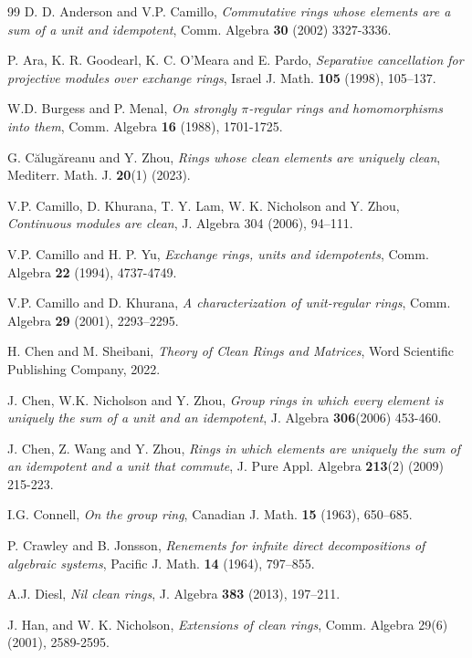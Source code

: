 \documentclass[12pt]{amsart}
\theoremstyle{definition}
\begin{document}

\begin{thebibliography}{99}
 D. D. Anderson and  V.P. Camillo, \textit{Commutative rings whose elements are a sum of a unit and idempotent},  Comm. Algebra  \textbf{ 30} (2002) 3327-3336.

P. Ara, K. R. Goodearl, K. C. O'Meara and  E. Pardo, \textit{Separative cancellation for projective modules over exchange rings},  Israel J. Math.  {\bf 105} (1998), 105--137.

 W.D. Burgess and P. Menal, \textit{On strongly $\pi$-regular rings and homomorphisms into them}, Comm. Algebra {\bf 16} (1988), 1701-1725.

G. C\u{a}lug\u{a}reanu and Y. Zhou, \textit{Rings whose clean elements are uniquely clean},  Mediterr. Math. J.  {\bf 20}(1) (2023).

V.P. Camillo, D. Khurana, T. Y. Lam, W. K. Nicholson and Y. Zhou, \textit{Continuous modules are clean},  J. Algebra 304 (2006), 94--111.

V.P. Camillo and  H. P. Yu, \textit{Exchange rings, units and idempotents}, Comm. Algebra {\bf 22} (1994), 4737-4749.

V.P. Camillo and  D. Khurana, \textit{A characterization of unit-regular rings},  Comm. Algebra {\bf 29} (2001), 2293--2295.

H. Chen and M. Sheibani, \textit{Theory of Clean Rings and Matrices}, Word Scientific Publishing Company, 2022.

J. Chen, W.K. Nicholson and  Y. Zhou, \textit{Group rings in which every element is uniquely the sum of a unit and an idempotent}, J. Algebra {\bf 306}(2006) 453-460.

J. Chen, Z. Wang and Y. Zhou, \textit{Rings in which elements are uniquely the sum of an idempotent and a unit that commute}, J. Pure Appl. Algebra {\bf 213}(2) (2009) 215-223.

I.G. Connell, \textit{On the group ring},  Canadian J. Math. {\bf 15} (1963), 650--685.

P. Crawley and B. Jonsson, \textit{Renements for infnite direct decompositions of algebraic systems},  Pacific J. Math.  {\bf 14} (1964), 797--855.

 A.J. Diesl, \textit{Nil clean rings},  J. Algebra {\bf 383} (2013), 197--211.

 J. Han, and  W. K. Nicholson, \textit{Extensions of clean rings},  Comm. Algebra
29(6) (2001), 2589-2595.


\end{thebibliography}
\end{document}
